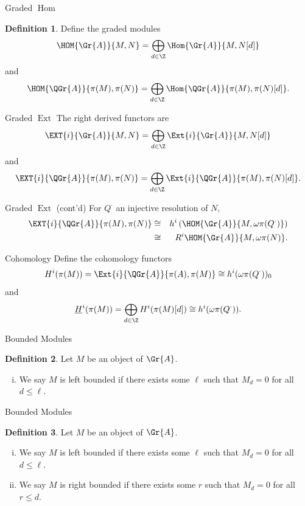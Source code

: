 \documentclass{beamer}
\theoremstyle{definition}
\newtheorem{defn}{Definition}
\begin{document}
\begin{frame}{Graded $\operatorname{Hom}$}
  \begin{defn}
    Define the graded modules
  $$\HOM{\Gr{A}}{M,N} = \bigoplus_{d \in \Z} \Hom{\Gr{A}}{M, N[d]}$$ 
  and 
  $$\HOM{\QGr{A}}{\pi(M), \pi(N)} = \bigoplus_{d \in \Z} \Hom{\QGr{A}}{\pi(M), \pi(N)[d]}.$$
  \end{defn}
\end{frame}

\begin{frame}{Graded $\operatorname{Ext}$}
  The right derived functors are
  $$\EXT{i}{\Gr{A}}{M,N} = \bigoplus_{d \in \Z}\Ext{i}{\Gr{A}}{M,N[d]}$$
  and
  $$\EXT{i}{\QGr{A}}{\pi(M),\pi(N)} = \bigoplus_{d \in \Z}\Ext{i}{\QGr{A}}{\pi(M),\pi(N)[d]}.$$
\end{frame}

\begin{frame}{Graded $\operatorname{Ext}$ (cont'd)}
  For $Q^\cdot$ an injective resolution of $N$, 
  \begin{eqnarray*}
    \EXT{i}{\QGr{A}}{\pi(M), \pi(N)} 
    &\cong& h^i\left(\HOM{\Gr{A}}{M, \omega\pi(Q^\cdot)}\right)\\
    &\cong& R^i\HOM{\Gr{A}}{M, \omega\pi(N)}.
  \end{eqnarray*}
\end{frame}

\begin{frame}{Cohomology}
  Define the cohomology functors
  $$H^i(\pi(M)) = \Ext{i}{\QGr{A}}{\pi(A), \pi(M)} \cong h^i(\omega\pi(Q^\cdot))_0$$
  and
  $$\underline{H}^i(\pi(M)) = \bigoplus_{d \in \Z} H^i(\pi(M)[d]) \cong h^i(\omega\pi(Q^\cdot)).$$
\end{frame}

\begin{frame}{Bounded Modules}
  \begin{defn}
    Let $M$ be an object of $\Gr{A}$.
    \begin{enumerate}[(i)]
    \item
      We say $M$ is left bounded if there exists some $\ell$ such that $M_d = 0$ for all $d \leq \ell$.
    \end{enumerate}
  \end{defn}
\end{frame}

\begin{frame}{Bounded Modules}
  \setcounter{defn}{5}
  \begin{defn}
    Let $M$ be an object of $\Gr{A}$.
    \begin{enumerate}[(i)]
    \item
      We say $M$ is left bounded if there exists some $\ell$ such that $M_d = 0$ for all $d \leq \ell$.
    \item
      We say $M$ is right bounded if there exists some $r$ such that $M_d = 0$ for all $r \leq d$.
    \end{enumerate}
  \end{defn}
\end{frame}
\end{document}
